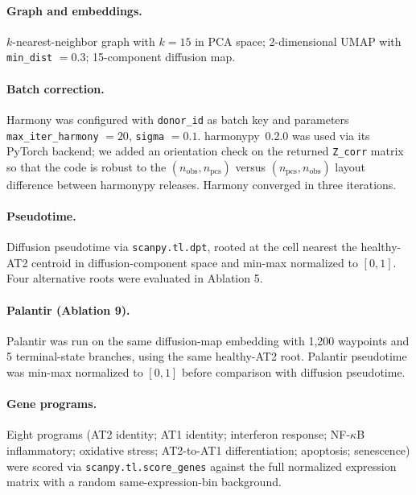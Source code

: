 \documentclass[11pt]{article}
\begin{document}
\paragraph{Graph and embeddings.} $k$-nearest-neighbor graph with $k = 15$ in PCA space; 2-dimensional UMAP with \texttt{min\_dist} $= 0.3$; 15-component diffusion map.

\paragraph{Batch correction.} Harmony \citep{Korsunsky2019} was configured with \texttt{donor\_id} as batch key and parameters \texttt{max\_iter\_harmony} $= 20$, \texttt{sigma} $= 0.1$. harmonypy~0.2.0 was used via its PyTorch backend; we added an orientation check on the returned \texttt{Z\_corr} matrix so that the code is robust to the $(n_\text{obs}, n_\text{pcs})$ versus $(n_\text{pcs}, n_\text{obs})$ layout difference between harmonypy releases. Harmony converged in three iterations.

\paragraph{Pseudotime.} Diffusion pseudotime \citep{Haghverdi2016} via \texttt{scanpy.tl.dpt}, rooted at the cell nearest the healthy-AT2 centroid in diffusion-component space and min-max normalized to $[0, 1]$. Four alternative roots were evaluated in Ablation 5.

\paragraph{Palantir (Ablation 9).} Palantir \citep{Setty2019} was run on the same diffusion-map embedding with 1{,}200 waypoints and 5 terminal-state branches, using the same healthy-AT2 root. Palantir pseudotime was min-max normalized to $[0, 1]$ before comparison with diffusion pseudotime.

\paragraph{Gene programs.} Eight programs (AT2 identity; AT1 identity; interferon response; NF-$\kappa$B inflammatory; oxidative stress; AT2-to-AT1 differentiation; apoptosis; senescence) were scored via \texttt{scanpy.tl.score\_genes} against the full normalized expression matrix with a random same-expression-bin background.
\end{document}
